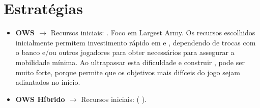 \documentclass[12pt]{article}
\begin{document}
\section{Estratégias}

\begin{itemize}
    \item \textbf{OWS $\rightarrow$}
    Recursos iniciais: .
    Foco em Largest Army.
    Os recursos escolhidos inicialmente permitem investimento rápido em  e , dependendo de trocas com o banco e/ou outros jogadores para obter  necessários para assegurar a mobilidade mínima. 
    Ao ultrapassar esta dificuldade e construir , pode ser muito forte, porque permite que os objetivos mais difíceis do jogo sejam adiantados no início.
    \item \textbf{OWS Híbrido $\rightarrow$}
    Recursos iniciais:  ( ).

\end{itemize}
\end{document}
